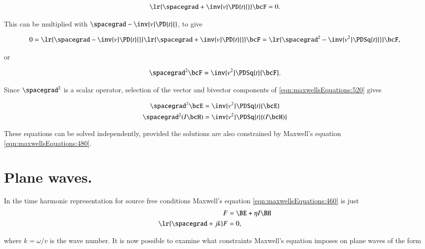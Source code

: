 \begin{dmath}\label{eqn:maxwellsEquations:480}
\lr{ \spacegrad + \inv{v} \PD{t}{} } \bcF = 0.
\end{dmath}

This can be multiplied with \( \spacegrad - \inv{v} \PD{t}{} \), to give

\begin{dmath}\label{eqn:maxwellsEquations:500}
0 =
\lr{ \spacegrad - \inv{v} \PD{t}{} }
\lr{ \spacegrad + \inv{v} \PD{t}{} } \bcF
=
\lr{ \spacegrad^2 - \inv{v^2} \PDSq{t}{} } \bcF,
\end{dmath}

or

\begin{dmath}\label{eqn:maxwellsEquations:520}
\spacegrad^2 \bcF = \inv{v^2} \PDSq{t}{\bcF}.
\end{dmath}

Since \( \spacegrad^2 \) is a scalar operator, selection of the vector and bivector components of \cref{eqn:maxwellsEquations:520} gives

\begin{dmath}\label{eqn:maxwellsEquations:540}
\begin{aligned}
\spacegrad^2 \bcE &= \inv{v^2} \PDSq{t}{\bcE} \\
\spacegrad^2 (I \bcH) &= \inv{v^2} \PDSq{t}{(I \bcH)} \\
\end{aligned}
\end{dmath}

These equations can be solved independently, provided the solutions are also constrained by Maxwell's equation \cref{eqn:maxwellsEquations:480}.

\section{Plane waves.}

In the time harmonic representation for source free conditions Maxwell's equation \cref{eqn:maxwellsEquations:460} is just
\begin{dmath}\label{eqn:maxwellsEquations:560}
\begin{aligned}
F &= \BE + \eta I \BH \\
\lr{ \spacegrad + j k } F &= 0,
\end{aligned}
\end{dmath}

where \( k = \omega/v \) is the wave number.  It is now possible to examine what constraints Maxwell's equation imposes on plane waves of the form

